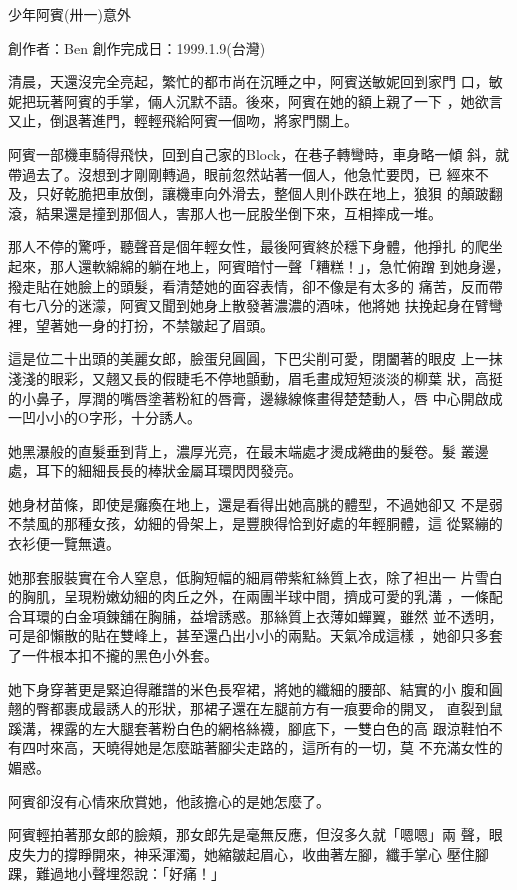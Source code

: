 



少年阿賓(卅一)意外

創作者：Ben
創作完成日：1999.1.9(台灣)


清晨，天還沒完全亮起，繁忙的都市尚在沉睡之中，阿賓送敏妮回到家門
口，敏妮把玩著阿賓的手掌，倆人沉默不語。後來，阿賓在她的額上親了一下
，她欲言又止，倒退著進門，輕輕飛給阿賓一個吻，將家門關上。

阿賓一部機車騎得飛快，回到自己家的Block，在巷子轉彎時，車身略一傾
斜，就帶過去了。沒想到才剛剛轉過，眼前忽然站著一個人，他急忙要閃，已
經來不及，只好乾脆把車放倒，讓機車向外滑去，整個人則仆跌在地上，狼狽
的顛跛翻滾，結果還是撞到那個人，害那人也一屁股坐倒下來，互相摔成一堆。

那人不停的驚呼，聽聲音是個年輕女性，最後阿賓終於穩下身體，他掙扎
的爬坐起來，那人還軟綿綿的躺在地上，阿賓暗忖一聲「糟糕！」，急忙俯蹭
到她身邊，撥走貼在她臉上的頭髮，看清楚她的面容表情，卻不像是有太多的
痛苦，反而帶有七八分的迷濛，阿賓又聞到她身上散發著濃濃的酒味，他將她
扶挽起身在臂彎裡，望著她一身的打扮，不禁皺起了眉頭。

這是位二十出頭的美麗女郎，臉蛋兒圓圓，下巴尖削可愛，閉闔著的眼皮
上一抹淺淺的眼彩，又翹又長的假睫毛不停地顫動，眉毛畫成短短淡淡的柳葉
狀，高挺的小鼻子，厚潤的嘴唇塗著粉紅的唇膏，邊緣線條畫得楚楚動人，唇
中心開啟成一凹小小的O字形，十分誘人。

她黑瀑般的直髮垂到背上，濃厚光亮，在最末端處才燙成綣曲的髮卷。髮
叢邊處，耳下的細細長長的棒狀金屬耳環閃閃發亮。

她身材苗條，即使是癱瘓在地上，還是看得出她高朓的體型，不過她卻又
不是弱不禁風的那種女孩，幼細的骨架上，是豐腴得恰到好處的年輕胴體，這
從緊繃的衣衫便一覽無遺。

她那套服裝實在令人窒息，低胸短幅的細肩帶紫紅絲質上衣，除了袒出一
片雪白的胸肌，呈現粉嫩幼細的肉丘之外，在兩團半球中間，擠成可愛的乳溝
，一條配合耳環的白金項鍊舖在胸脯，益增誘惑。那絲質上衣薄如蟬翼，雖然
並不透明，可是卻懶散的貼在雙峰上，甚至還凸出小小的兩點。天氣冷成這樣
，她卻只多套了一件根本扣不攏的黑色小外套。

她下身穿著更是緊迫得離譜的米色長窄裙，將她的纖細的腰部、結實的小
腹和圓翹的臀都裹成最誘人的形狀，那裙子還在左腿前方有一痕要命的開叉，
直裂到鼠蹊溝，裸露的左大腿套著粉白色的網格絲襪，腳底下，一雙白色的高
跟涼鞋怕不有四吋來高，天曉得她是怎麼踮著腳尖走路的，這所有的一切，莫
不充滿女性的媚惑。

阿賓卻沒有心情來欣賞她，他該擔心的是她怎麼了。

阿賓輕拍著那女郎的臉頰，那女郎先是毫無反應，但沒多久就「嗯嗯」兩
聲，眼皮失力的撐睜開來，神采渾濁，她縮皺起眉心，收曲著左腳，纖手掌心
壓住腳踝，難過地小聲埋怨說：「好痛！」


